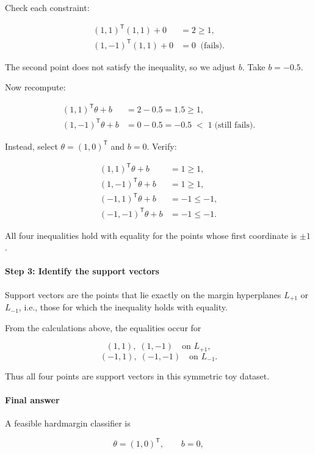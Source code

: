 \documentclass[12pt, a4paper]{article}
\begin{document}
Check each constraint:

\[
\begin{aligned}
(1,1)^{\mathsf T}(1,1) + 0 &= 2 \ge 1,\\
(1,-1)^{\mathsf T}(1,1) + 0 &= 0 \;\;\text{(fails)}.
\end{aligned}
\]

The second point does not satisfy the inequality, so we adjust \(b\).  Take \(b = -0.5\).

Now recompute:

\[
\begin{aligned}
(1,1)^{\mathsf T}\theta + b &= 2 - 0.5 = 1.5 \ge 1,\\
(1,-1)^{\mathsf T}\theta + b &= 0 - 0.5 = -0.5 \;<\; 1 \;\text{(still fails)}.
\end{aligned}
\]

Instead, select \(\theta = (1,0)^{\mathsf T}\) and \(b = 0\).  Verify:

\[
\begin{aligned}
(1,1)^{\mathsf T}\theta + b &= 1 \ge 1,\\
(1,-1)^{\mathsf T}\theta + b &= 1 \ge 1,\\
(-1,1)^{\mathsf T}\theta + b &= -1 \le -1,\\
(-1,-1)^{\mathsf T}\theta + b &= -1 \le -1 .
\end{aligned}
\]

All four inequalities hold with equality for the points whose first coordinate is \(\pm1\).  

\paragraph{Step 3: Identify the support vectors}
Support vectors are the points that lie exactly on the margin hyperplanes \(L_{+1}\) or \(L_{-1}\), i.e., those for which the inequality holds with equality.

From the calculations above, the equalities occur for

\[
(1,1),\; (1,-1) \quad\text{on } L_{+1},
\]
\[
(-1,1),\; (-1,-1) \quad\text{on } L_{-1}.
\]

Thus all four points are support vectors in this symmetric toy dataset.

\paragraph{Final answer}
A feasible hardmargin classifier is  

\[
\theta = (1,0)^{\mathsf T},\qquad b = 0,
\]
\end{document}
